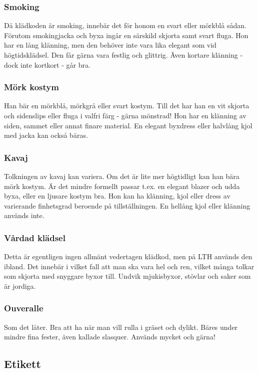 \documentclass{article}
\begin{document}
\subsubsection{Smoking}
Då klädkoden är smoking, innebär det för honom en svart
eller mörkblå sådan. Förutom smokingjacka och byxa
ingår en särskild skjorta samt svart fluga. Hon har en lång
klänning, men den behöver inte vara lika elegant som vid
högtidsklädsel. Den får gärna vara festlig och glittrig.
Även kortare klänning - dock inte kortkort - går bra.
\subsubsection{Mörk kostym}
Han bär en mörkblå, mörkgrå eller svart kostym. Till det
har han en vit skjorta och sidenslips eller fluga i valfri färg
- gärna mönstrad! Hon har en klänning av siden, sammet
eller annat finare material. En elegant byxdress eller
halvlång kjol med jacka kan också bäras.

\subsubsection{Kavaj}
Tolkningen av kavaj kan variera. Om det är lite mer
högtidligt kan han bära mörk kostym. Är det mindre
formellt passar t.ex. en elegant blazer och udda byxa,
eller en ljusare kostym bra. Hon kan ha klänning, kjol eller
dress av varierande finhetsgrad beroende på
tillställningen. En hellång kjol eller klänning används inte.

\subsubsection{Vårdad klädsel}
Detta är egentligen ingen allmänt vedertagen klädkod,
men på LTH används den ibland. Det innebär i vilket fall
att man ska vara hel och ren, vilket många tolkar som
skjorta med snyggare byxor till. Undvik mjukisbyxor,
stövlar och saker som är jordiga.

\subsubsection{Ouveralle}
Som det låter. Bra att ha när man vill rulla i gräset och
dylikt. Bäres under mindre fina fester, även kallade
slasquer. Används mycket och gärna!

\newpage
\subsection{Etikett}
\end{document}
